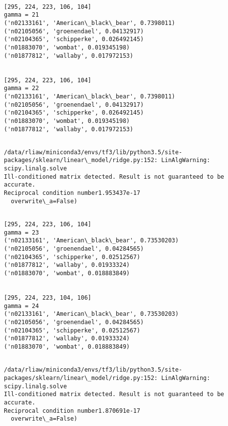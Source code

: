 \documentclass[11pt]{article}
\begin{document}
    \begin{Verbatim}[commandchars=\\\{\}]

[295, 224, 223, 106, 104]
gamma = 21
('n02133161', 'American\_black\_bear', 0.7398011)
('n02105056', 'groenendael', 0.04132917)
('n02104365', 'schipperke', 0.026492145)
('n01883070', 'wombat', 0.019345198)
('n01877812', 'wallaby', 0.017972153)


[295, 224, 223, 106, 104]
gamma = 22
('n02133161', 'American\_black\_bear', 0.7398011)
('n02105056', 'groenendael', 0.04132917)
('n02104365', 'schipperke', 0.026492145)
('n01883070', 'wombat', 0.019345198)
('n01877812', 'wallaby', 0.017972153)


    \end{Verbatim}

    \begin{Verbatim}[commandchars=\\\{\}]
/data/rliaw/miniconda3/envs/tf3/lib/python3.5/site-packages/sklearn/linear\_model/ridge.py:152: LinAlgWarning: scipy.linalg.solve
Ill-conditioned matrix detected. Result is not guaranteed to be accurate.
Reciprocal condition number1.953437e-17
  overwrite\_a=False)

    \end{Verbatim}

    \begin{Verbatim}[commandchars=\\\{\}]

[295, 224, 223, 106, 104]
gamma = 23
('n02133161', 'American\_black\_bear', 0.73530203)
('n02105056', 'groenendael', 0.04284565)
('n02104365', 'schipperke', 0.02512567)
('n01877812', 'wallaby', 0.01933324)
('n01883070', 'wombat', 0.018883849)


[295, 224, 223, 104, 106]
gamma = 24
('n02133161', 'American\_black\_bear', 0.73530203)
('n02105056', 'groenendael', 0.04284565)
('n02104365', 'schipperke', 0.02512567)
('n01877812', 'wallaby', 0.01933324)
('n01883070', 'wombat', 0.018883849)


    \end{Verbatim}

    \begin{Verbatim}[commandchars=\\\{\}]
/data/rliaw/miniconda3/envs/tf3/lib/python3.5/site-packages/sklearn/linear\_model/ridge.py:152: LinAlgWarning: scipy.linalg.solve
Ill-conditioned matrix detected. Result is not guaranteed to be accurate.
Reciprocal condition number1.870691e-17
  overwrite\_a=False)

    \end{Verbatim}
\end{document}

